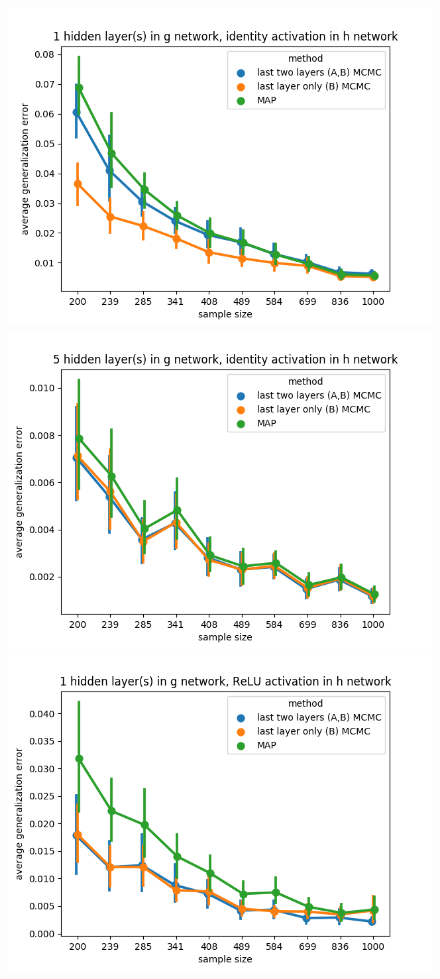 \documentclass{article} %
\begin{document}
\begin{figure}[h!]
	\begin{center}
		\includegraphics[scale=0.35]{taskid8.png}
		\includegraphics[scale=0.35]{taskid9.png}
		\includegraphics[scale=0.35]{taskid10.png}

\end{center}
\end{figure}
\end{document}
